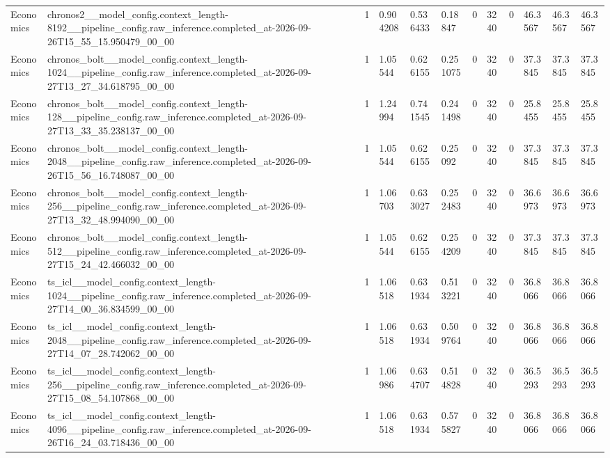 \begin{tabular}{llllllllllll}
Economics & chronos2\_\_model\_config.context\_length-8192\_\_pipeline\_config.raw\_inference.completed\_at-2026-09-26T15\_55\_15.950479\_00\_00 & 1 & 0.904208 & 0.536433 & 0.18847 & 0 & 3240 & 0 & 46.3567 & 46.3567 & 46.3567 \\
Economics & chronos\_bolt\_\_model\_config.context\_length-1024\_\_pipeline\_config.raw\_inference.completed\_at-2026-09-27T13\_27\_34.618795\_00\_00 & 1 & 1.05544 & 0.626155 & 0.251075 & 0 & 3240 & 0 & 37.3845 & 37.3845 & 37.3845 \\
Economics & chronos\_bolt\_\_model\_config.context\_length-128\_\_pipeline\_config.raw\_inference.completed\_at-2026-09-27T13\_33\_35.238137\_00\_00 & 1 & 1.24994 & 0.741545 & 0.241498 & 0 & 3240 & 0 & 25.8455 & 25.8455 & 25.8455 \\
Economics & chronos\_bolt\_\_model\_config.context\_length-2048\_\_pipeline\_config.raw\_inference.completed\_at-2026-09-26T15\_56\_16.748087\_00\_00 & 1 & 1.05544 & 0.626155 & 0.25092 & 0 & 3240 & 0 & 37.3845 & 37.3845 & 37.3845 \\
Economics & chronos\_bolt\_\_model\_config.context\_length-256\_\_pipeline\_config.raw\_inference.completed\_at-2026-09-27T13\_32\_48.994090\_00\_00 & 1 & 1.06703 & 0.633027 & 0.252483 & 0 & 3240 & 0 & 36.6973 & 36.6973 & 36.6973 \\
Economics & chronos\_bolt\_\_model\_config.context\_length-512\_\_pipeline\_config.raw\_inference.completed\_at-2026-09-27T15\_24\_42.466032\_00\_00 & 1 & 1.05544 & 0.626155 & 0.254209 & 0 & 3240 & 0 & 37.3845 & 37.3845 & 37.3845 \\
Economics & ts\_icl\_\_model\_config.context\_length-1024\_\_pipeline\_config.raw\_inference.completed\_at-2026-09-27T14\_00\_36.834599\_00\_00 & 1 & 1.06518 & 0.631934 & 0.513221 & 0 & 3240 & 0 & 36.8066 & 36.8066 & 36.8066 \\
Economics & ts\_icl\_\_model\_config.context\_length-2048\_\_pipeline\_config.raw\_inference.completed\_at-2026-09-27T14\_07\_28.742062\_00\_00 & 1 & 1.06518 & 0.631934 & 0.509764 & 0 & 3240 & 0 & 36.8066 & 36.8066 & 36.8066 \\
Economics & ts\_icl\_\_model\_config.context\_length-256\_\_pipeline\_config.raw\_inference.completed\_at-2026-09-27T15\_08\_54.107868\_00\_00 & 1 & 1.06986 & 0.634707 & 0.514828 & 0 & 3240 & 0 & 36.5293 & 36.5293 & 36.5293 \\
Economics & ts\_icl\_\_model\_config.context\_length-4096\_\_pipeline\_config.raw\_inference.completed\_at-2026-09-26T16\_24\_03.718436\_00\_00 & 1 & 1.06518 & 0.631934 & 0.575827 & 0 & 3240 & 0 & 36.8066 & 36.8066 & 36.8066 \\

\end{tabular}
